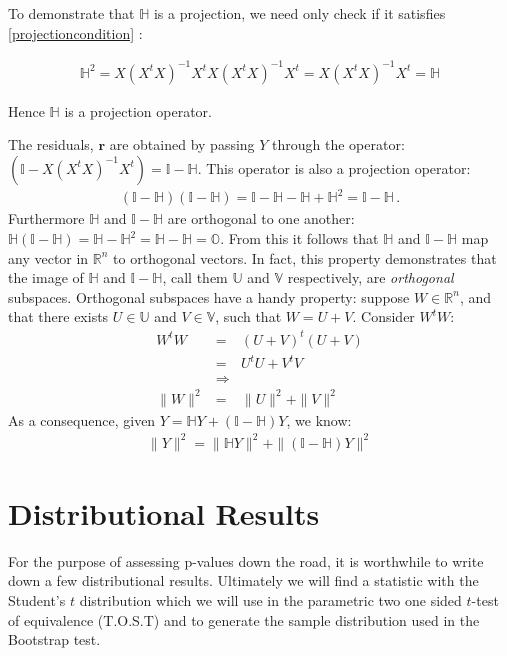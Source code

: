 To demonstrate that $\mathbb{H}$  is a projection, we need only check if it satisfies  \ref{projectioncondition} :

\begin{eqnarray}
\mathbb{H}^2 =  X (X^t X)^{-1} X^t  X (X^t X)^{-1} X^t = X (X^t X)^{-1}X^t = \mathbb{H}
\end{eqnarray}

Hence $\mathbb{H}$ is a projection operator.

The residuals, $\mathbf{r}$ are obtained by passing $Y$ through the operator: $(\mathbb{I} - X (X^t X)^{-1} X^t ) = \mathbb{I} - \mathbb{H} $. This operator is also a projection operator:
\begin{eqnarray}
(\mathbb{I} - \mathbb{H})(\mathbb{I} - \mathbb{H}) = \mathbb{I} - \mathbb{H} - \mathbb{H} + \mathbb{H}^2 = \mathbb{I} - \mathbb{H}\,.
\end{eqnarray}
Furthermore $\mathbb{H}$ and $\mathbb{I} - \mathbb{H}$ are orthogonal to one another: $\mathbb{H} (\mathbb{I} - \mathbb{H}) = \mathbb{H} - \mathbb{H}^2 = \mathbb{H} - \mathbb{H} = \mathbb{O}$. From this it follows that $\mathbb{H}$ and $\mathbb{I} - \mathbb{H}$ map any vector in $\mathbb{R}^n$ to orthogonal vectors. In fact, this property demonstrates that the image of $\mathbb{H}$ and $\mathbb{I} - \mathbb{H}$, call them $\mathbb{U}$ and $\mathbb{V}$ respectively, are \emph{orthogonal} subspaces. Orthogonal subspaces have a handy property: suppose  $W \in \mathbb{R}^n$, and that there exists  $ U \in \mathbb{U}$ and $V \in \mathbb{V}$, such that $ W = U + V$. Consider $W^t W$: 
\begin{eqnarray} 
W^t W & = & (U + V)^t(U + V)  \nonumber \\
& = & U^t U + V^t V \nonumber  \\
& \Rightarrow & \nonumber \\
\| W \|^2 &=& \| U \| ^2 + \| V \|^2
\end{eqnarray}
As a consequence,  given $Y = \mathbb{H}Y + (\mathbb{I} - \mathbb{H})Y$, we know:
\begin{eqnarray} \label{pythagoras} \| Y \|^2 = \| \mathbb{H}Y \| ^2 + \| (\mathbb{I} - \mathbb{H})Y \|^2  \end{eqnarray}

\section{Distributional Results}
\label{Distributional Results}
For the purpose of assessing p-values down the road, it is worthwhile to write down a few distributional results. Ultimately we will find a statistic with the Student's $t$ distribution which we will use in the parametric two one sided $t$-test of equivalence (T.O.S.T) and to generate the sample distribution used in the Bootstrap test.

